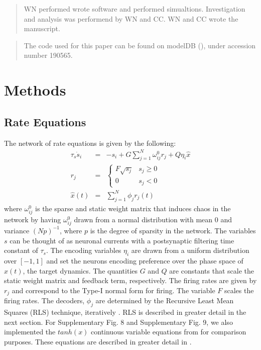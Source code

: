 \documentclass[11pt]{article} %
\begin{document}
\renewcommand{\abstractname}{Author Contributions}
\begin{abstract}
WN performed wrote software and performed simualtions.  
Investigation and analysis was performend by WN and CC.  
WN and CC wrote the manuscript.   
\end{abstract}


\renewcommand{\abstractname}{Data Availability Statement}
\begin{abstract}
The code used for this paper can be found on modelDB (\cite{modeldb}), 
under accession number 190565.
\end{abstract}

\section*{Methods} 
\subsection*{Rate Equations} 

The network of rate equations is given by the following:
\begin{eqnarray}
\tau_s\dot{s}_i &=& -s_i + G\sum_{j=1}^N \omega^0_{ij} r_j + Q\eta_i \hat{x}\\
r_j &=& \begin{cases} F \sqrt{s_j} & s_j\geq 0 \\ 0 & s_j <0   \end{cases} \\
\hat{x}(t) &=& \sum_{j=1}^N \phi_j r_j(t) 
\end{eqnarray} 
where $\omega^0_{ij} $ is the sparse and static weight matrix that induces 
chaos in the network by having $\omega^0_{ij}$ drawn from a normal distribution 
with mean 0 and variance $(Np)^{-1}$, where $p$ is the degree of sparsity 
in the network.  The variables $s$ can be thought of as neuronal 
currents with a postsynaptic filtering time constant of $\tau_s$.   
The encoding variables $\eta_i$ are drawn from a uniform distribution 
over $[-1,1]$ and set the neurons encoding preference over the phase space 
of $x(t)$, the target dynamics.  The quantities $G$ and $Q$ are constants 
that scale the static weight matrix and feedback term, respectively.   
The firing rates are given by $r_j$ and correspond to the Type-I normal form for firing.  
The variable $F$ scales the firing rates.    
The decoders, $\phi_j$ are determined by the Recursive Least Mean Squares (RLS) technique, 
iteratively \cite{haykin,bishop}.  RLS is described in greater detail in the next section.  
For Supplementary Fig. 8 and Supplementary Fig. 9, 
we also implemented the $tanh(x)$ continuous variable equations 
from \cite{FORCE1} for comparison purposes.  
These equations are described in greater detail in \cite{FORCE1}.  
 
\end{document}
